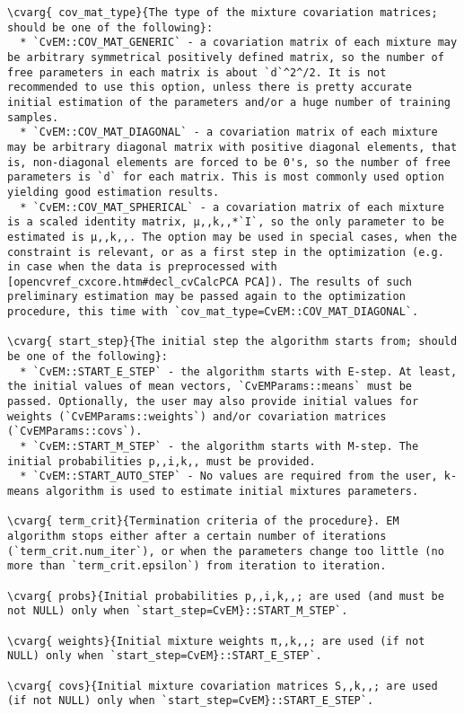 \begin{verbatim}
\cvarg{ cov_mat_type}{The type of the mixture covariation matrices; should be one of the following}:
  * `CvEM::COV_MAT_GENERIC` - a covariation matrix of each mixture may be arbitrary symmetrical positively defined matrix, so the number of free parameters in each matrix is about `d`^2^/2. It is not recommended to use this option, unless there is pretty accurate initial estimation of the parameters and/or a huge number of training samples.
  * `CvEM::COV_MAT_DIAGONAL` - a covariation matrix of each mixture may be arbitrary diagonal matrix with positive diagonal elements, that is, non-diagonal elements are forced to be 0's, so the number of free parameters is `d` for each matrix. This is most commonly used option yielding good estimation results.
  * `CvEM::COV_MAT_SPHERICAL` - a covariation matrix of each mixture is a scaled identity matrix, μ,,k,,*`I`, so the only parameter to be estimated is μ,,k,,. The option may be used in special cases, when the constraint is relevant, or as a first step in the optimization (e.g. in case when the data is preprocessed with [opencvref_cxcore.htm#decl_cvCalcPCA PCA]). The results of such preliminary estimation may be passed again to the optimization procedure, this time with `cov_mat_type=CvEM::COV_MAT_DIAGONAL`.

\cvarg{ start_step}{The initial step the algorithm starts from; should be one of the following}:
  * `CvEM::START_E_STEP` - the algorithm starts with E-step. At least, the initial values of mean vectors, `CvEMParams::means` must be passed. Optionally, the user may also provide initial values for weights (`CvEMParams::weights`) and/or covariation matrices (`CvEMParams::covs`).
  * `CvEM::START_M_STEP` - the algorithm starts with M-step. The initial probabilities p,,i,k,, must be provided.
  * `CvEM::START_AUTO_STEP` - No values are required from the user, k-means algorithm is used to estimate initial mixtures parameters.

\cvarg{ term_crit}{Termination criteria of the procedure}. EM algorithm stops either after a certain number of iterations (`term_crit.num_iter`), or when the parameters change too little (no more than `term_crit.epsilon`) from iteration to iteration.

\cvarg{ probs}{Initial probabilities p,,i,k,,; are used (and must be not NULL) only when `start_step=CvEM}::START_M_STEP`.

\cvarg{ weights}{Initial mixture weights π,,k,,; are used (if not NULL) only when `start_step=CvEM}::START_E_STEP`.

\cvarg{ covs}{Initial mixture covariation matrices S,,k,,; are used (if not NULL) only when `start_step=CvEM}::START_E_STEP`.


\end{verbatim}
